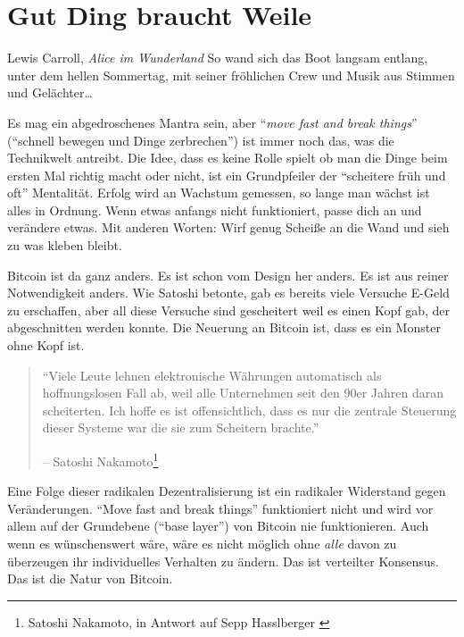 \chapter{Gut Ding braucht Weile}
\label{les:18}

\begin{chapquote}{Lewis Carroll, \textit{Alice im Wunderland}}
So wand sich das Boot langsam entlang, unter dem hellen Sommertag, mit seiner
fröhlichen Crew und Musik aus Stimmen und Gelächter\ldots
\end{chapquote}

Es mag ein abgedroschenes Mantra sein, aber \enquote{\textit{move fast and break
things}} (\enquote{schnell bewegen und Dinge zerbrechen}) ist immer noch das, was
die Technikwelt antreibt. Die Idee, dass es keine Rolle spielt ob man die Dinge
beim ersten Mal richtig macht oder nicht, ist ein Grundpfeiler der
\enquote{scheitere früh und oft} Mentalität. Erfolg wird an Wachstum gemessen,
so lange man wächst ist alles in Ordnung. Wenn etwas anfangs nicht funktioniert,
passe dich an und verändere etwas. Mit anderen Worten: Wirf genug Scheiße an die
Wand und sieh zu was kleben bleibt.

Bitcoin ist da ganz anders. Es ist schon vom Design her anders. Es ist aus
reiner Notwendigkeit anders. Wie Satoshi betonte, gab es bereits viele Versuche
E-Geld zu erschaffen, aber all diese Versuche sind gescheitert weil es einen
Kopf gab, der abgeschnitten werden konnte. Die Neuerung an Bitcoin ist, dass es
ein Monster ohne Kopf ist.

\begin{quotation}\begin{samepage}
\enquote{Viele Leute lehnen elektronische Währungen automatisch als
hoffnungslosen Fall ab, weil alle Unternehmen seit den 90er Jahren daran
scheiterten. Ich hoffe es ist offensichtlich, dass es nur die zentrale Steuerung
dieser Systeme war die sie zum Scheitern brachte.} \begin{flushright} -- Satoshi
Nakamoto\footnote{Satoshi Nakamoto, in  Antwort auf Sepp Hasslberger
\cite{satoshi-centralized-nature}}
\end{flushright}\end{samepage}\end{quotation}

Eine Folge dieser radikalen Dezentralisierung ist ein radikaler Widerstand gegen
Veränderungen. \enquote{Move fast and break things} funktioniert nicht und wird
vor allem auf der Grundebene (\enquote{base layer}) von Bitcoin nie
funktionieren. Auch wenn es wünschenswert wäre, wäre es nicht möglich ohne
\textit{alle} davon zu überzeugen ihr individuelles Verhalten zu ändern. Das ist
verteilter Konsensus. Das ist die Natur von Bitcoin.

